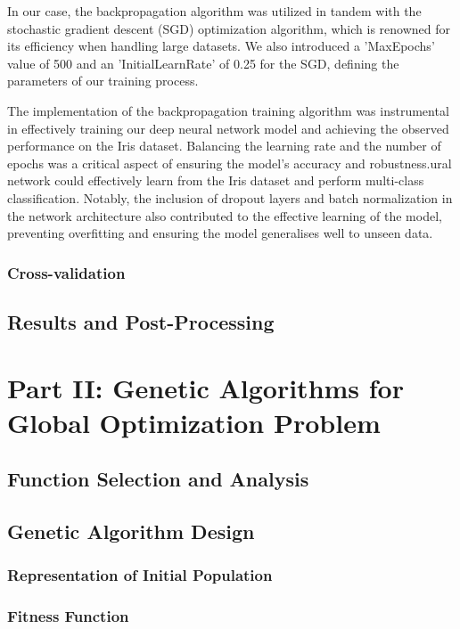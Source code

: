 \documentclass[conference]{inc/IEEEtran}
\begin{document}
In our case, the backpropagation algorithm was utilized in tandem with the stochastic gradient descent (SGD) optimization algorithm, which is renowned
for its efficiency when handling large datasets. We also introduced a 'MaxEpochs' value of 500 and an 'InitialLearnRate' of 0.25 for the SGD, defining
the parameters of our training process.

The implementation of the backpropagation training algorithm was instrumental in effectively training our deep neural network model and achieving the
observed performance on the Iris dataset. Balancing the learning rate and the number of epochs was a critical aspect of ensuring the model's accuracy
and robustness.ural network could effectively learn from the Iris dataset and perform multi-class classification. Notably, the inclusion of dropout
layers and batch normalization in the network architecture also contributed to the effective learning of the model, preventing overfitting and ensuring
the model generalises well to unseen data.

\subsubsection{Cross-validation}

\subsection{Results and Post-Processing}

\section{Part II: Genetic Algorithms for Global Optimization Problem}

\subsection{Function Selection and Analysis}
\subsection{Genetic Algorithm Design}

\subsubsection{Representation of Initial Population}

\subsubsection{Fitness Function}
\end{document}
